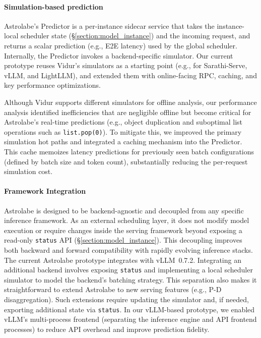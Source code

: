 \documentclass[sigconf, review, anonymous]{acmart}
\begin{document}
\paragraph{Simulation-based prediction}
Astrolabe's Predictor is a per-instance sidecar service that takes the instance-local scheduler state (\S\ref{section:model_instance}) and the incoming request, and returns a scalar prediction (e.g., E2E latency) used by the global scheduler. Internally, the Predictor invokes a backend-specific simulator. Our current prototype reuses Vidur's simulators as a starting point (e.g., for Sarathi-Serve, vLLM, and LightLLM), and extended them with online-facing RPC, caching, and key performance optimizations.

Although Vidur supports different simulators for offline analysis, our performance analysis identified inefficiencies that are negligible offline but become critical for Astrolabe's real-time predictions (e.g., object duplication and suboptimal list operations such as \texttt{list.pop(0)}). To mitigate this, we improved the primary simulation hot paths and integrated a caching mechanism into the Predictor. This cache memoizes latency predictions for previously seen batch configurations (defined by batch size and token count), substantially reducing the per-request simulation cost.


\paragraph{Framework Integration}
Astrolabe is designed to be backend-agnostic and decoupled from any specific inference framework. As an external scheduling layer, it does not modify model execution or require changes inside the serving framework beyond exposing a read-only \texttt{status} API (\S\ref{section:model_instance}). This decoupling improves both backward and forward compatibility with rapidly evolving inference stacks. The current Astrolabe prototype integrates with vLLM~0.7.2. Integrating an additional backend involves exposing \texttt{status} and implementing a local scheduler simulator to model the backend's batching strategy. This separation also makes it straightforward to extend Astrolabe to new serving features (e.g., P-D disaggregation). Such extensions require updating the simulator and, if needed, exporting additional state via \texttt{status}. In our vLLM-based prototype, we enabled vLLM's multi-process frontend (separating the inference engine and API frontend processes) to reduce API overhead and improve prediction fidelity.
\end{document}
